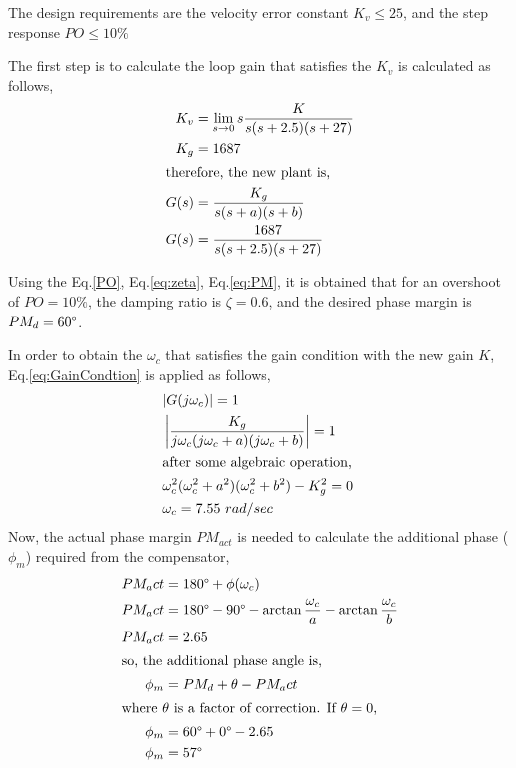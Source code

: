 \documentclass[11pt, a4paper]{article}
\begin{document}
The design requirements are the velocity error constant $K_v\leq 25$, and the step response $PO\leq 10\%$

The first step is to calculate the loop gain that satisfies the $K_v$ is calculated as follows,
\begin{align}
K_v &= \lim\limits_{s \rightarrow 0} s \dfrac{K}{s(s+2.5) (s+27)} \\
K_g &= 1687 \nonumber\\
\intertext{therefore, the new plant is,} 
G(s) &= \dfrac{K_g}{s(s+a)(s+b)} \\
G(s) &= \dfrac{1687}{s(s+2.5)(s+27)} \nonumber
\end{align}

Using the Eq.\eqref{PO}, Eq.\eqref{eq:zeta}, Eq.\eqref{eq:PM}, it is obtained that for an overshoot of $PO=10 \%$, the damping ratio is $\zeta = 0.6$, and the desired phase margin is $PM_d=60\degree$.

In order to obtain the  $\omega_c$ that satisfies the gain condition with the new gain $K$, Eq.\eqref{eq:GainCondtion} is applied as follows,
\begin{align}
&\arrowvert G(j\omega_c) \arrowvert = 1 \nonumber\\
&\left| \dfrac{K_g}{j\omega_c(j\omega_c+a)(j\omega_c+b)} \right| = 1 \nonumber\\
\intertext{after some algebraic operation, }
&\omega_c^2(\omega_c^2+a^2)(\omega_c^2+b^2)-K_g^2 = 0 \nonumber \\
&\omega_c = 7.55 ~rad/sec \nonumber
\end{align}
Now, the actual phase margin $PM_{act}$ is needed to calculate the additional phase ($\phi_m$) required from the compensator,
\begin{align}
PM_act &= 180\degree + \phi(\omega_c) \\
PM_act &= 180\degree - 90\degree -\arctan \frac{\omega_c}{a} - \arctan \frac{\omega_c}{b} \nonumber \\
PM_act &= 2.65 \nonumber\\
\intertext{so, the additional phase angle is,} 
\phi_m &= PM_d+\theta-PM_act \\
\intertext{where $\theta$ is a factor of correction. If $\theta=0$,}
\phi_m &= 60\degree + 0\degree - 2.65 \nonumber\\
\phi_m &= 57 \degree \nonumber
\end{align}
\end{document}
